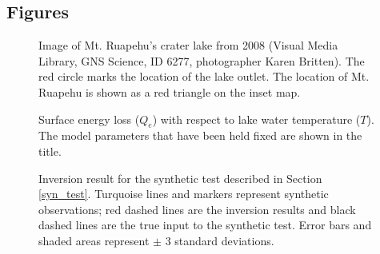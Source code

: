 \documentclass[doublespacing, linenumbers]{bmcart}
\def\texttt{[image: ]}
\begin{document}
\begin{backmatter}



\section*{Figures}

\begin{figure}[h!]
    \caption{Image of Mt. Ruapehu's crater lake from 2008 (\textcopyright Visual
        Media Library, GNS Science, ID 6277, photographer Karen Britten). The red
        circle marks the location of the lake outlet. The location of Mt. Ruapehu is
        shown as a red triangle on the inset map.}
      \label{overview}
\end{figure}

\begin{figure}[h!]
    \caption{Surface energy loss ($Q_e$) with respect to lake water temperature
             ($T$). The model parameters that have been held fixed are shown in  
             the title.}
      \label{sens}
\end{figure}
    
\begin{figure}[h!]
    \caption{Inversion result for the synthetic test described in Section
        \ref{syn_test}. Turquoise lines and markers represent synthetic
        observations; red dashed lines are the inversion results and black
        dashed lines are the true input to the synthetic test. Error bars and
        shaded areas represent $\pm$ 3 standard deviations.}
  \label{syn_example}
\end{figure}


\end{backmatter}
\end{document}
